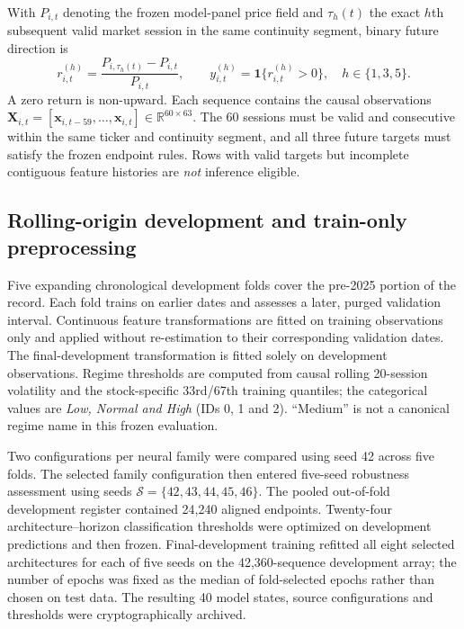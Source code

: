 \documentclass[fleqn,10pt]{wlscirep}
\begin{document}
With $P_{i,t}$ denoting the frozen model-panel price field and $\tau_h(t)$ the exact $h$th subsequent valid market session in the same continuity segment, binary future direction is
\begin{equation}\label{eq:target}
r_{i,t}^{(h)}=\frac{P_{i,\tau_h(t)}-P_{i,t}}{P_{i,t}},\qquad
y_{i,t}^{(h)}=\mathbf 1\{r_{i,t}^{(h)}>0\},\quad h\in\{1,3,5\}.
\end{equation}
A zero return is non-upward. Each sequence contains the causal observations $\mathbf{X}_{i,t}=[\mathbf{x}_{i,t-59},\ldots,\mathbf{x}_{i,t}]\in\mathbb{R}^{60\times63}$. The 60 sessions must be valid and consecutive within the same ticker and continuity segment, and all three future targets must satisfy the frozen endpoint rules. Rows with valid targets but incomplete contiguous feature histories are \emph{not} inference eligible.

\subsection{Rolling-origin development and train-only preprocessing}
Five expanding chronological development folds cover the pre-2025 portion of the record. Each fold trains on earlier dates and assesses a later, purged validation interval. Continuous feature transformations are fitted on training observations only and applied without re-estimation to their corresponding validation dates. The final-development transformation is fitted solely on development observations. Regime thresholds are computed from causal rolling 20-session volatility and the stock-specific 33rd/67th training quantiles; the categorical values are \emph{Low, Normal and High} (IDs 0, 1 and 2). ``Medium'' is not a canonical regime name in this frozen evaluation.

Two configurations per neural family were compared using seed 42 across five folds. The selected family configuration then entered five-seed robustness assessment using seeds $\mathcal S=\{42,43,44,45,46\}$. The pooled out-of-fold development register contained 24,240 aligned endpoints. Twenty-four architecture--horizon classification thresholds were optimized on development predictions and then frozen. Final-development training refitted all eight selected architectures for each of five seeds on the 42,360-sequence development array; the number of epochs was fixed as the median of fold-selected epochs rather than chosen on test data. The resulting 40 model states, source configurations and thresholds were cryptographically archived.
\end{document}
